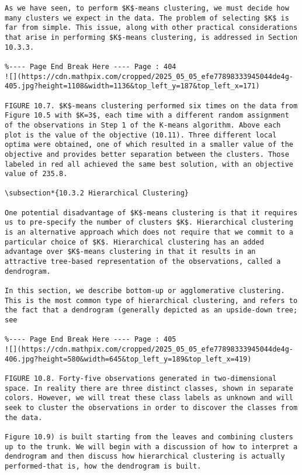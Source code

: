 \documentclass[10pt]{article}
\begin{document}
\begin{verbatim}
As we have seen, to perform $K$-means clustering, we must decide how many clusters we expect in the data. The problem of selecting $K$ is far from simple. This issue, along with other practical considerations that arise in performing $K$-means clustering, is addressed in Section 10.3.3.

%---- Page End Break Here ---- Page : 404
![](https://cdn.mathpix.com/cropped/2025_05_05_efe77898333945044de4g-405.jpg?height=1108&width=1136&top_left_y=187&top_left_x=171)

FIGURE 10.7. $K$-means clustering performed six times on the data from Figure 10.5 with $K=3$, each time with a different random assignment of the observations in Step 1 of the K-means algorithm. Above each plot is the value of the objective (10.11). Three different local optima were obtained, one of which resulted in a smaller value of the objective and provides better separation between the clusters. Those labeled in red all achieved the same best solution, with an objective value of 235.8.

\subsection*{10.3.2 Hierarchical Clustering}

One potential disadvantage of $K$-means clustering is that it requires us to pre-specify the number of clusters $K$. Hierarchical clustering is an alternative approach which does not require that we commit to a particular choice of $K$. Hierarchical clustering has an added advantage over $K$-means clustering in that it results in an attractive tree-based representation of the observations, called a dendrogram.

In this section, we describe bottom-up or agglomerative clustering. This is the most common type of hierarchical clustering, and refers to the fact that a dendrogram (generally depicted as an upside-down tree; see

%---- Page End Break Here ---- Page : 405
![](https://cdn.mathpix.com/cropped/2025_05_05_efe77898333945044de4g-406.jpg?height=580&width=645&top_left_y=189&top_left_x=419)

FIGURE 10.8. Forty-five observations generated in two-dimensional space. In reality there are three distinct classes, shown in separate colors. However, we will treat these class labels as unknown and will seek to cluster the observations in order to discover the classes from the data.

Figure 10.9) is built starting from the leaves and combining clusters up to the trunk. We will begin with a discussion of how to interpret a dendrogram and then discuss how hierarchical clustering is actually performed-that is, how the dendrogram is built.


\end{verbatim}
\end{document}
